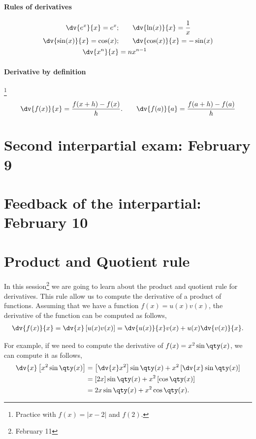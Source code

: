 \documentclass[../main-notes.tex]{subfile}
\begin{document}
\paragraph{Rules of derivatives}
\begin{align*}
    \dv{e^{x}}{x} = e^{x}; &\qquad \dv{\ln(x)}{x} = \frac{1}{x}\\
    \dv{\sin(x)}{x} = \cos(x);  &\qquad \dv{\cos(x)}{x} = -\sin(x)\\
    \dv{x^n}{x} &= n x^{n-1}
\end{align*}

\paragraph{Derivative by definition}\footnote{Practice with $f(x) = |x-2|$ and $f(2)$.}
\begin{gather*}
    \dv{f(x)}{x} = \frac{f(x+h) - f(x)}{h}.\qquad 
    \dv{f(a)}{a} = \frac{f(a+h) - f(a)}{h} 
\end{gather*}


\newpage

\section{Second interpartial exam: February 9}

\section{Feedback of the interpartial: February 10}

\newpage

\section{Product and Quotient rule}

In this session\footnote{February 11} we are going to learn about the product and quotient rule for derivatives.
This rule allow us to compute the derivative of a product of functions.
Assuming that we have a function \(f(x) = u(x)v(x)\), the derivative of the function can be computed as follows,
\begin{gather}
    \dv{f(x)}{x} = \dv{x}\left[u(x)v(x)\right] = \dv{u(x)}{x}v(x) + u(x)\dv{v(x)}{x}.
\end{gather}

For example, if we need to compute the derivative of \(f(x) = x^{2}\sin\qty(x)\), we can compute it as follows,
\begin{align*}
    \dv{x}\left[x^{2}\sin\qty(x)\right] &= \left[\dv{x}x^{2}\right]\sin\qty(x) + x^{2}\left[\dv{x}\sin\qty(x)\right] \\
                                        &= \left[2x\right]\sin\qty(x) + x^{2}\left[\cos\qty(x)\right] \\
                                        &= 2x\sin\qty(x) + x^{2}\cos\qty(x).
\end{align*}
\end{document}
